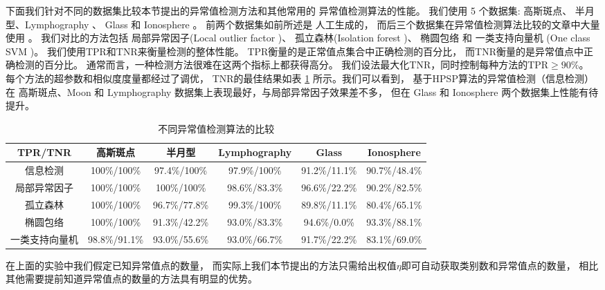 下面我们针对不同的数据集比较本节提出的异常值检测方法和其他常用的
异常值检测算法的性能。
我们使用 5 个数据集: 高斯斑点、 半月型、Lymphography
\cite{lazarevic2005feature}、 Glass 和 Ionosphere \cite{keller2012hics}。 
前两个数据集如前所述是
人工生成的，
而后三个数据集在异常值检测算法比较的文章中大量使用
\cite{campos2016evaluation}。
我们对比的方法包括
局部异常因子(Local outlier factor \citep{Breunig})、
孤立森林(Isolation forest \citep{if})、
椭圆包络  和
一类支持向量机 (One class SVM \citep{svm})。 
我们使用TPR和TNR来衡量检测的整体性能。
TPR衡量的是正常值点集合中正确检测的百分比，
而TNR衡量的是异常值点中正确检测的百分比。
通常而言，一种检测方法很难在这两个指标上都获得高分。
我们设法最大化TNR，同时控制每种方法的TPR$\geq 90\%$。
每个方法的超参数和相似度度量都经过了调优，
TNR的最佳结果如表 \ref{tab:odm} 所示。我们可以看到，
基于HPSP算法的异常值检测（信息检测）在 高斯斑点、Moon 和
Lymphography 数据集上表现最好，与局部异常因子效果差不多，
但在 Glass 和  Ionosphere 两个数据集上性能有待提升。
\begin{table}
  \begin{adjustbox}{width=\columnwidth,center}
\begin{tabular}{cccccc}
  \hline
         TPR/TNR        &  高斯斑点   &      半月型       &  Lymphography  &     Glass     &  Ionosphere   \\
  \hline
      信息检测    & 100\%/100\% & 97.4\%/100\%  & 97.9\%/100\% & 91.2\%/11.1\% & 90.7\%/48.4\% \\
      局部异常因子 & 100\%/100\% & 100\%/100\% & 98.6\%/83.3\%  & 96.6\%/22.2\% & 90.2\%/82.5\% \\
   孤立森林   & 100\%/100\% &  96.7\%/77.8\%  & 99.3\%/100\% & 89.8\%/11.1\% & 80.4\%/65.1\% \\
    椭圆包络   & 100\%/100\% &  91.3\%/42.2\%  & 93.0\%/83.3\%  & 94.6\%/0.0\%  & 93.3\%/88.1\% \\
     一类支持向量机     &  98.8\%/91.1\%  &  93.0\%/55.6\%  & 93.0\%/66.7\%  & 91.7\%/22.2\% & 83.1\%/69.0\% \\
  \hline
  \end{tabular}
\end{adjustbox}
\caption{不同异常值检测算法的比较}\label{tab:odm}
\end{table}

在上面的实验中我们假定已知异常值点的数量，
而实际上我们本节提出的方法只需给出权值$\eta$即可自动获取类别数和异常值点的数量，
相比其他需要提前知道异常值点的数量的方法具有明显的优势。



